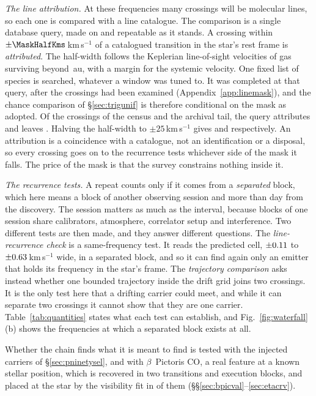 \emph{The line attribution.} At these frequencies many crossings will be
molecular lines, so each one is compared with a line catalogue. The
comparison is a single database query, made on \MkListDate{} and repeatable
as it stands. A crossing within $\pm\MaskHalfKms$\,km\,s$^{-1}$ of a
catalogued transition in the star's rest frame is \emph{attributed}. The
half-width follows the Keplerian line-of-sight velocities of gas surviving
beyond \EcKepRAu\,au, with a margin for the systemic velocity. One fixed list of
\FrNSpec{} species is searched, whatever a window was tuned to. It was
completed at that query, after the crossings had been examined
(Appendix~\ref{app:linemask}), and the chance comparison of
\S\ref{sec:trigunif} is therefore conditional on the mask as adopted. Of the
\CnCross{} crossings of the census and the archival tail, the query attributes
\FrAttrWFifty{} and leaves \FrUnattrWFifty. Halving the half-width to
$\pm25$\,km\,s$^{-1}$ gives \FrAttrWTwentyFive{} and \FrUnattrWTwentyFive{}
respectively.
An attribution is a coincidence with a catalogue, not an identification or a
disposal, so every crossing goes on to the recurrence tests whichever side of
the mask it falls. The price of the mask is that the survey constrains
nothing inside it.

\emph{The recurrence tests.} A repeat counts only if it comes from a
\emph{separated} block, which here means a block of another observing session
and more than \EpSep{} day from the discovery. The session matters as much as
the interval, because blocks of one session share calibrators, atmosphere,
correlator setup and interference. Two different tests are then made, and
they answer different questions. The \emph{line-recurrence check} is a
same-frequency test. It reads the predicted cell, $\pm0.11$ to
$\pm0.63$\,km\,s$^{-1}$ wide, in a separated block, and so it can find
again only an emitter that holds its frequency in the star's frame. The
\emph{trajectory comparison} asks instead whether one bounded trajectory
inside the drift grid joins two crossings. It is the only test here that a
drifting carrier could meet, and while it can separate two crossings it
cannot show that they are one carrier. Table~\ref{tab:quantities} states what
each test can establish, and Fig.~\ref{fig:waterfall}(b) shows the frequencies
at which a separated block exists at all.

Whether the chain finds what it is meant to find is tested with the injected
carriers of \S\ref{sec:pninetysel}, and with $\beta$~Pictoris CO, a real
feature at a known stellar position, which is recovered in two
transitions and \CsBpCoBlocks{} execution blocks, and placed at the star by
the visibility fit in \AcBpNLocalWord{} of them (\S\S\ref{sec:bpicval}--\ref{sec:etacrv}).


